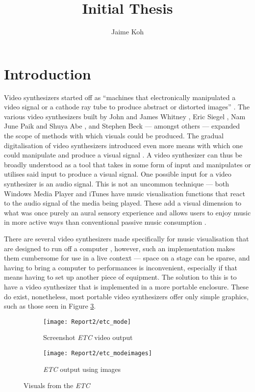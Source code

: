 \documentclass{report}
\title{Initial Thesis}
\author{Jaime Koh}
\begin{document}
\newpage
\maketitle
\tableofcontents
\newpage

\section*{Introduction}
\markright{}
Video synthesizers started off as ``machines that electronically manipulated a video signal or a cathode ray tube to produce abstract or distorted images'' \cite{Collopy2014}. The various video synthesizers built by John and James Whitney \cite{Patterson2009}, Eric Siegel \cite{ElectronicArtsIntermix}, Nam June Paik and Shuya Abe \cite{Furlong1983}, and Stephen Beck \cite{Beck1992} --- amongst others --- expanded the scope of methods with which visuals could be produced. The gradual digitalisation of video synthesizers introduced even more means with which one could manipulate and produce a visual signal \cite{Collopy2014}. A video synthesizer can thus be broadly understood as a tool that takes in some form of input and manipulates or utilises said input to produce a visual signal. One possible input for a video synthesizer is an audio signal. This is not an uncommon technique --- both Windows Media Player and iTunes have music visualisation functions that react to the audio signal of the media being played. These add a visual dimension to what was once purely an aural sensory experience and allows users to enjoy music in more active ways than conventional passive music consumption \cite{Casey2008}. \par

There are several video synthesizers made specifically for music visualisation that are designed to run off a computer \cite{Casey2008}, however, such an implementation makes them cumbersome for use in a live context --- space on a stage can be sparse, and having to bring a computer to performances is inconvenient, especially if that means having to set up another piece of equipment. The solution to this is to have a video synthesizer that is implemented in a more portable enclosure. These do exist, nonetheless, most portable video synthesizers offer only simple graphics, such as those seen in Figure \ref{fig:etc}.

\begin{figure}[b]
  \begin{subfigure}{0.5\textwidth}
  \texttt{[image: Report2/etc\_mode]}
  \caption{Screenshot \textit{ETC} video output}
  \label{fig:etc_mode}
\end{subfigure}
\begin{subfigure}{0.5\textwidth}
  \texttt{[image: Report2/etc\_modeimages]}
  \caption{\textit{ETC} output using images}
  \label{fig:etc_modeimages}
\end{subfigure}
\caption{Visuals from the \textit{ETC}}
\label{fig:etc}
\end{figure}
\end{document}
